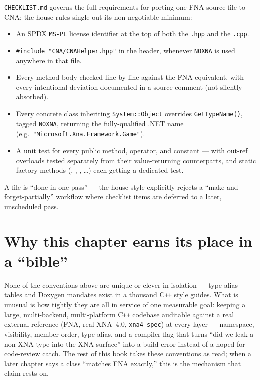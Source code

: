 \texttt{CHECKLIST.md} governs the full requirements for porting one FNA source file to CNA;
the house rules single out its non-negotiable minimum:

\begin{itemize}
  \item An SPDX \texttt{MS-PL} license identifier at the top of both the \texttt{.hpp} and
        the \texttt{.cpp}.
  \item \texttt{\#include "CNA/CNAHelper.hpp"} in the header, whenever \texttt{NOXNA} is used
        anywhere in that file.
  \item Every method body checked line-by-line against the FNA equivalent, with every
        intentional deviation documented in a source comment (not silently absorbed).
  \item Every concrete class inheriting \texttt{System::Object} overrides
        \texttt{GetTypeName()}, tagged \texttt{NOXNA}, returning the fully-qualified .NET
        name (e.g.\ \texttt{"Microsoft.Xna.Framework.Game"}).
  \item A unit test for every public method, operator, and constant --- with out-ref
        overloads tested separately from their value-returning counterparts, and static
        factory methods (, ,
        , \ldots) each getting a dedicated test.
\end{itemize}

A file is ``done in one pass'' --- the house style explicitly rejects a
``make-and-forget-partially'' workflow where checklist items are deferred to a later,
unscheduled pass.

\section{Why this chapter earns its place in a ``bible''}

None of the conventions above are unique or clever in isolation --- type-alias tables and
Doxygen mandates exist in a thousand C\texttt{++} style guides. What is unusual is how tightly
they are all in service of one measurable goal: keeping a large, multi-backend,
multi-platform C\texttt{++} codebase auditable against a real external reference (FNA, real
XNA~4.0, \texttt{xna4-spec}) at every layer --- namespace, visibility, member order, type
alias, and a compiler flag that turns ``did we leak a non-XNA type into the XNA surface''
into a build error instead of a hoped-for code-review catch. The rest of this book takes
these conventions as read; when a later chapter says a class ``matches FNA exactly,'' this is
the mechanism that claim rests on.
